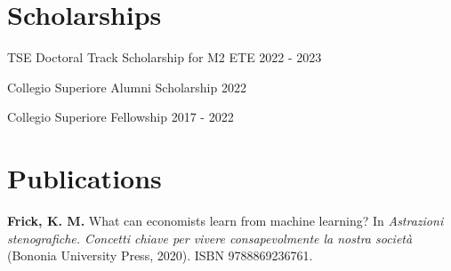 \documentclass[11pt, a4paper]{article}
\begin{document}
\section*{Scholarships}

TSE Doctoral Track Scholarship for M2 ETE \hfill 2022 - 2023


Collegio Superiore Alumni Scholarship \hfill 2022


Collegio Superiore Fellowship \hfill 2017 - 2022

\section*{Publications}

\textbf{Frick, K. M.} What can economists learn from machine learning? In
\emph{Astrazioni stenografiche. Concetti chiave per vivere consapevolmente la nostra società} (Bononia University Press, 2020). ISBN 9788869236761.
\end{document}
